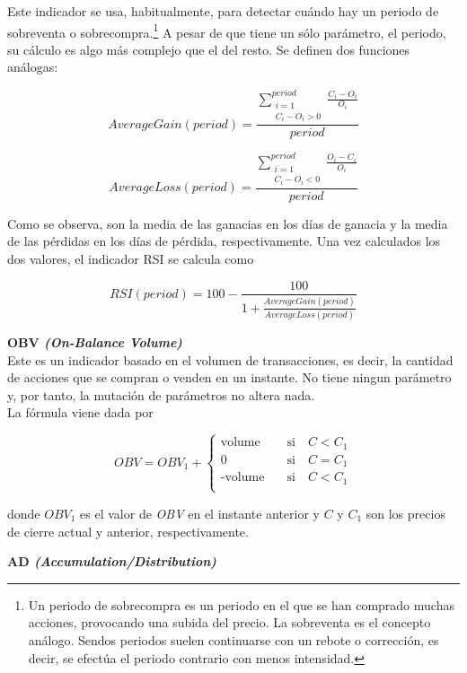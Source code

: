 \begin{appendices}
Este indicador se usa, habitualmente, para detectar cu\'ando hay un periodo de sobreventa o sobrecompra.\footnote{Un periodo de sobrecompra es un periodo en el que se han comprado muchas acciones, provocando una subida del precio. La sobreventa es el concepto an\'alogo. Sendos periodos suelen continuarse con un rebote o correcci\'on, es decir, se efect\'ua el periodo contrario con menos intensidad.} A pesar de que tiene un s\'olo par\'ametro, el periodo, su c\'alculo es algo m\'as complejo que el del resto. Se definen dos funciones an\'alogas:

\[AverageGain(period) = \frac{\sum\limits_{\substack{i=1 \\ C_i - O_i > 0}}^{period}\frac{C_i-O_i}{O_i}}{period}\]

\[AverageLoss(period) = \frac{\sum\limits_{\substack{i=1 \\ C_i - O_i < 0}}^{period}\frac{O_i-C_i}{O_i}}{period}\]

Como se observa, son la media de las ganacias en los d\'ias de ganacia y la media de las p\'erdidas en los d\'ias de p\'erdida, respectivamente. Una vez calculados los dos valores, el indicador RSI se calcula como

\[RSI(period) = 100 - \frac{100}{1+\frac{AverageGain(period)}{AverageLoss(period)}}\]

\vspace{0.5cm}
\noindent\textbf{OBV \textit{(On-Balance Volume)}}\\

Este es un indicador basado en el volumen de transacciones, es decir, la cantidad de acciones que se compran o venden en un instante. No tiene ningun par\'ametro y, por tanto, la mutaci\'on de par\'ametros no altera nada.\\

La f\'ormula viene dada por

\[   
OBV = OBV_{1} +
\begin{cases}
\text{volume} &\quad\text{si}\quad C < C_{1}\\
\text{0} &\quad\text{si}\quad   C = C_{1}\\
\text{-volume} &\quad\text{si}\quad  C < C_{1}\\ 
\end{cases}
\]

donde $OBV_{1}$ es el valor de \textit{OBV} en el instante anterior y $C$ y $C_1$ son los precios de cierre actual y anterior, respectivamente.\\
\newpage

\noindent\textbf{AD \textit{(Accumulation/Distribution)}}\\


\end{appendices}
